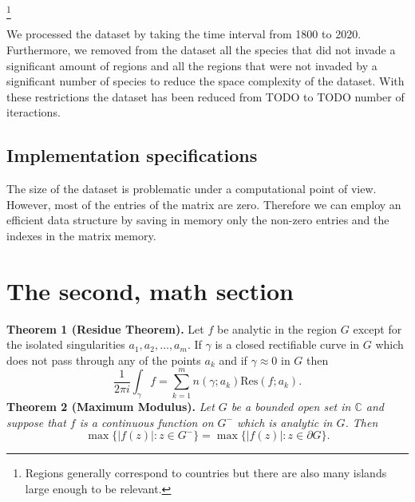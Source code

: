 \documentclass[mscthesis]{usiinfthesis}
\begin{document}

\footnote{Regions generally correspond to countries but there are also many islands large enough to be relevant.}

We processed the dataset by taking the time interval from 1800 to 2020. Furthermore, we removed from the dataset all the species that did not invade a significant amount of regions and all the regions that were not invaded by a significant number of species to reduce the space complexity of the dataset. With these restrictions the dataset has been reduced from TODO to TODO number of iteractions.


\subsection{Implementation specifications}
The size of the dataset is problematic under a computational point of view. However, most of the entries of the matrix are zero. Therefore we can employ an efficient data structure by saving in memory only the non-zero entries and the indexes in the matrix memory. 

\section{The second, math section}

\textbf{Theorem 1 (Residue Theorem).}
Let $f$ be analytic in the region $G$ except for the isolated singularities $a_1,a_2,\ldots,a_m$. If $\gamma$ is a closed rectifiable curve in $G$ which does not pass through any of the points $a_k$ and if $\gamma\approx 0$ in $G$ then
\[
\frac{1}{2\pi i}\int_\gamma f = \sum_{k=1}^m n(\gamma;a_k) \text{Res}(f;a_k).
\]
\textbf{Theorem 2 (Maximum Modulus).}
\emph{Let $G$ be a bounded open set in $\mathbb{C}$ and suppose that $f$ is a continuous function on $G^-$ which is analytic in $G$. Then}
\[
\max\{|f(z)|:z\in G^-\}=\max \{|f(z)|:z\in \partial G \}.
\]
\end{document}
